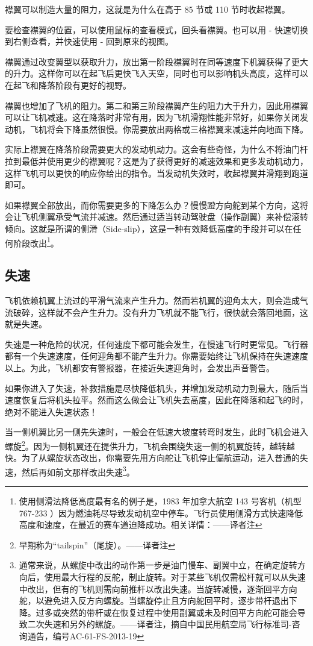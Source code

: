 襟翼可以制造大量的阻力，这就是为什么在高于 85 节或 110 节时收起襟翼。

要检查襟翼的位置，可以使用鼠标的查看模式，回头看襟翼。也可以用 - 快速切换到右侧查看，并快速使用 - 回到原来的视图。

襟翼通过改变翼型以获取升力，放出第一阶段襟翼时在同等速度下机翼获得了更大的升力。这样你可以在起飞后更快飞入天空，同时也可以影响机头高度，这样可以在起飞和降落阶段有更好的视野。

襟翼也增加了飞机的阻力。第二和第三阶段襟翼产生的阻力大于升力，因此用襟翼可以让飞机减速。这在降落时非常有用，因为飞机滑翔性能非常好，如果你关闭发动机，飞机将会下降虽然很慢。你需要放出两格或三格襟翼来减速并向地面下降。

实际上襟翼在降落阶段需要更大的发动机动力。这会有些奇怪，为什么不将油门杆拉到最低并使用更少的襟翼呢？这是为了获得更好的减速效果和更多发动机动力，这样飞机可以更快的响应你给出的指令。当发动机失效时，收起襟翼并滑翔到跑道即可。


如果襟翼全部放出，而你需要更多的下降怎么办？慢慢蹬方向舵到某个方向，这将会让飞机侧翼承受气流并减速。然后通过适当转动驾驶盘（操作副翼）来补偿滚转倾向。这就是所谓的侧滑（Side-slip），这是一种有效降低高度的手段并可以在任何阶段改出\footnote{使用侧滑法降低高度最有名的例子是，1983 年加拿大航空 143 号客机（机型 767-233 ）因为燃油耗尽导致发动机空中停车。飞行员使用侧滑方式快速降低高度和速度，在最近的赛车道迫降成功。相关详情：——译者注}。

\subsection{失速}
\label{sec:Stall}

飞机依赖机翼上流过的平滑气流来产生升力。然而若机翼的迎角太大，则会造成气流破碎，这样就不会产生升力。没有升力飞机就不能飞行，很快就会落回地面，这就是失速。

失速是一种危险的状况，任何速度下都可能会发生，在慢速飞行时更常见。飞行器都有一个失速速度，任何迎角都不能产生升力。你需要始终让飞机保持在失速速度以上。为此，飞机都安有警报器，在接近失速迎角时，会发出声音警告。

如果你进入了失速，补救措施是尽快降低机头，并增加发动机动力到最大，随后当速度恢复后将机头拉平。然而这么做会让飞机失去高度，因此在降落和起飞的时，绝对不能进入失速状态！

当一侧机翼比另一侧先失速时，一般会在低速大坡度转弯时发生，此时飞机会进入螺旋\footnote{早期称为“tailspin”（尾旋）。——译者注}。因为一侧机翼还在提供升力，飞机会围绕失速一侧的机翼旋转，越转越快。为了从螺旋状态改出，你需要先用方向舵让飞机停止偏航运动，进入普通的失速，然后再如前文那样改出失速\footnote{通常来说，从螺旋中改出的动作第一步是油门慢车、副翼中立，在确定旋转方向后，使用最大行程的反舵，制止旋转。对于某些飞机仅需松杆就可以从失速中改出，但有的飞机则需向前推杆以改出失速。当旋转减慢，逐渐回平方向舵，以避免进入反方向螺旋。当螺旋停止且方向舵回平时，逐步带杆退出下降。过多或突然的带杆或在恢复过程中使用副翼或未及时回平方向舵可能会导致二次失速和另外的螺旋。——译者注，摘自中国民用航空局飞行标准司-咨询通告，编号AC-61-FS-2013-19}。


